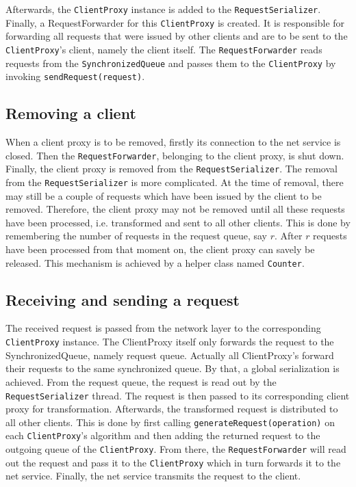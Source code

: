 Afterwards, the \texttt{ClientProxy} instance is added to the \texttt{RequestSerializer}. Finally, a RequestForwarder for this \texttt{ClientProxy} is created. It is responsible for forwarding all requests that were issued by other clients and are to be sent to the \texttt{ClientProxy}'s client, namely the client itself. The \texttt{RequestForwarder} reads requests from the \texttt{SynchronizedQueue} and passes them to the \texttt{ClientProxy} by invoking \texttt{sendRequest(request)}.

\subsection{Removing a client}
When a client proxy is to be removed, firstly its connection to the net service is closed. Then the \texttt{RequestForwarder}, belonging to the client proxy, is shut down. Finally, the client proxy is removed from the \texttt{RequestSerializer}. The removal from the \texttt{RequestSerializer} is more complicated. At the time of removal, there may still be a couple of requests which have been issued by the client to be removed. Therefore, the client proxy may not be removed until all these requests have been processed, i.e. transformed and sent to all other clients. This is done by remembering the number of requests in the request queue, say $r$. After $r$ requests have been processed from that moment on, the client proxy can savely be released. This mechanism is achieved by a helper class named \texttt{Counter}.

\subsection{Receiving and sending a request}
The received request is passed from the network layer to the corresponding \texttt{ClientProxy} instance. The {ClientProxy} itself only forwards the request to the {SynchronizedQueue}, namely request queue. Actually all {ClientProxy}'s forward their requests to the same synchronized queue. By that, a global serialization is achieved. From the request queue, the request is read out by the \texttt{RequestSerializer} thread. The request is then passed to its corresponding client proxy for transformation. Afterwards, the transformed request is distributed to all other clients. This is done by first calling \texttt{generateRequest(operation)} on each \texttt{ClientProxy}'s algorithm and then adding the returned request to the outgoing queue of the \texttt{ClientProxy}. From there, the \texttt{RequestForwarder} will read out the request and pass it to the \texttt{ClientProxy} which in turn forwards it to the net service. Finally, the net service transmits the request to the client.

